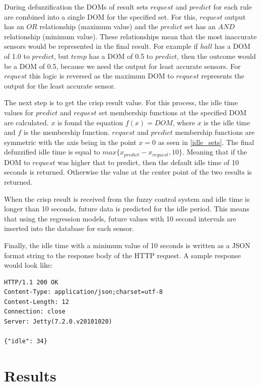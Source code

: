 During defuzzification the DOMs of result sets $request$ and $predict$ for each rule are combined into a single DOM for the specified set. For this, $request$ output has an $OR$ relationship (maximum value) and the $predict$ set has an $AND$ relationship (minimum value). These relationships mean that the most inaccurate sensors would be represented in the final result. For example if $hall$ has a DOM of 1.0 to $predict$, but $temp$ has a DOM of 0.5 to $predict$, then the outcome would be a DOM of 0.5, because we need the output for least accurate sensors. For $request$ this logic is reversed as the maximum DOM to $request$ represents the output for the least accurate sensor. 

The next step is to get the crisp result value. For this process, the idle time values for $predict$ and $request$ set membership functions at the specified DOM are calculated. $x$ is found the equation $f(x) = DOM$, where $x$ is the idle time and $f$ is the membership function. $request$ and $predict$ membership functions are symmetric with the axis being in the point $x = 0$ as seen in \autoref{idle_sets}. The final defuzzified idle time is equal to $max\{x_{predict} - x_{request}, 10\}$. Meaning that if the DOM to $request$ was higher that to predict, then the default idle time of 10 seconds is returned. Otherwise the value at the center point of the two results is returned.

When the crisp result is received from the fuzzy control system and idle time is longer than 10 seconds, future data is predicted for the idle period. This means that using the regression models, future values with 10 second intervals are inserted into the database for each sensor. 

Finally, the idle time with a minimum value of 10 seconds is written as a JSON format string to the response body of the HTTP request. A sample response would look like:

\begin{lstlisting}
HTTP/1.1 200 OK
Content-Type: application/json;charset=utf-8
Content-Length: 12
Connection: close
Server: Jetty(7.2.0.v20101020)

{"idle": 34}
\end{lstlisting}

\section{Results}

